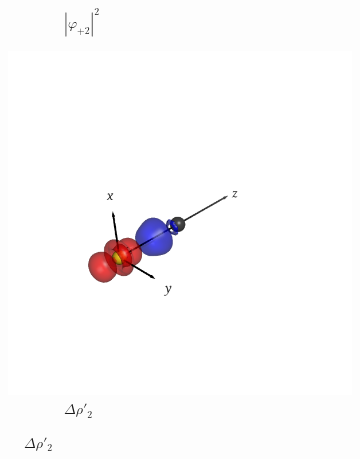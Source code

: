 \documentclass[journal=inoraj,manuscript=article]{achemso}
\begin{document}
\begin{figure}[!h]
\begin{subfigure}[t]{0.32\textwidth}
        \caption*{\ \ \ \ \ \ \ \ $|\varphi_{+2}|^2$}
    \end{subfigure}
    \hfill
    \begin{subfigure}[t]{0.32\textwidth}
        \centering
        \includegraphics[width=\linewidth]{./AuCn+/pair3.png} 
        \caption*{\ \ \ \ \ \ \ \ $\Delta \rho'_2$} 
    \end{subfigure}


\end{figure}
\end{document}

